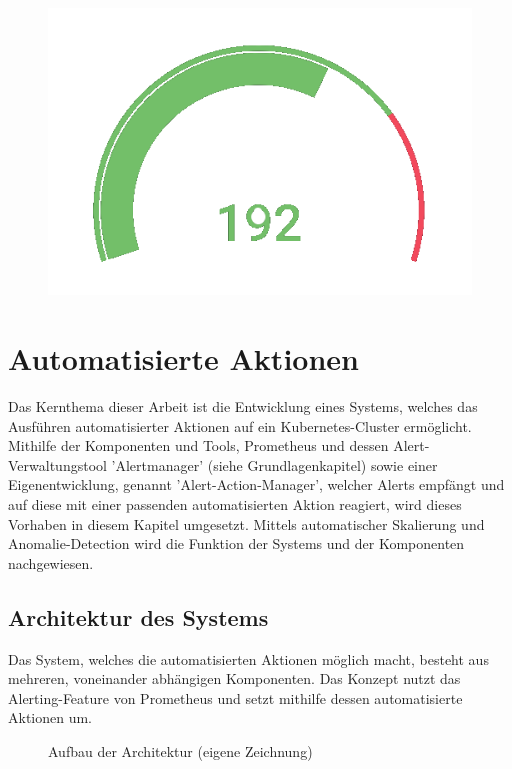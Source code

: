 \documentclass[a4paper,10pt]{scrartcl}
\begin{document}
\begin{figure}[htbp]
\includegraphics[scale=.8]{img/PercantageTransparent.png}
\end{figure}

\pagebreak
\section{Automatisierte Aktionen}

Das Kernthema dieser Arbeit ist die Entwicklung eines Systems, welches das Ausführen automatisierter Aktionen auf ein Kubernetes-Cluster ermöglicht. Mithilfe der Komponenten und Tools, Prometheus und dessen Alert-Verwaltungstool 'Alertmanager' (siehe Grundlagenkapitel) sowie einer Eigenentwicklung, genannt 'Alert-Action-Manager', welcher Alerts empfängt und auf diese mit einer passenden automatisierten Aktion reagiert, wird dieses Vorhaben in diesem Kapitel umgesetzt. Mittels automatischer Skalierung und Anomalie-Detection wird die Funktion der Systems und der Komponenten nachgewiesen.


\pagebreak
\subsection{Architektur des Systems}

Das System, welches die automatisierten Aktionen möglich macht, besteht aus mehreren, voneinander abhängigen Komponenten. Das Konzept nutzt das Alerting-Feature von Prometheus und setzt mithilfe dessen automatisierte Aktionen um.\\

\begin{figure}[htbp]
  \centering
  \scalebox{.6}{}
  \caption{Aufbau der Architektur (eigene Zeichnung)}
\end{figure}
\end{document}
